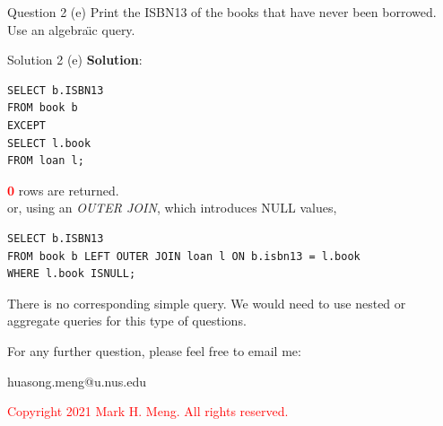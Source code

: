 \begin{frame}[fragile]{Question 2 (e)}
Print the ISBN13 of the books that have never been borrowed. Use an algebra\"{\i}c query.
\end{frame}

\begin{frame}[fragile]{Solution 2 (e)}
\textbf{Solution}:
\begin{lstlisting}
SELECT b.ISBN13 
FROM book b
EXCEPT
SELECT l.book 
FROM loan l;
\end{lstlisting}

\vspace{5pt}
\textcolor{red}{\textbf{0}} rows are returned.\\
\vspace{10pt}
or, using an \textit{OUTER JOIN}, which introduces NULL values,

\begin{lstlisting}
SELECT b.ISBN13 
FROM book b LEFT OUTER JOIN loan l ON b.isbn13 = l.book
WHERE l.book ISNULL;
\end{lstlisting}

There is no corresponding simple query. We would need to use nested or aggregate queries for this type of questions.

\end{frame}

\begin{frame}{}
\centering  
For any further question, please feel free to email me:\vspace{10pt}

huasong.meng@u.nus.edu \vspace{20pt}

\begin{tcolorbox}
	\begin{center}
		\textcolor{red}{Copyright 2021 Mark H. Meng. All rights reserved.}
	\end{center}
\end{tcolorbox}

\end{frame}